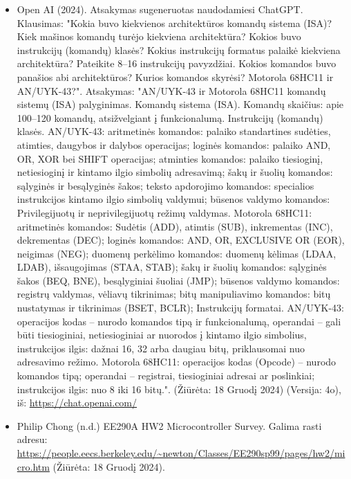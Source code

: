 \documentclass[a4paper,12pt]{article}
\begin{document}
\begin{itemize}
    \item Open AI (2024). Atsakymas sugeneruotas naudodamiesi ChatGPT. Klausimas: "Kokia buvo kiekvienos architektūros komandų sistema (ISA)? Kiek mašinos komandų turėjo kiekviena architektūra? Kokios buvo instrukcijų (komandų) klasės? Kokius instrukcijų formatus palaikė kiekviena architektūra? Pateikite 8–16 instrukcijų pavyzdžiai. Kokios komandos buvo panašios abi architektūros? Kurios komandos skyrėsi? Motorola 68HC11 ir AN/UYK-43?". Atsakymas: "AN/UYK-43 ir Motorola 68HC11 komandų sistemų (ISA) palyginimas. Komandų sistema (ISA). Komandų skaičius: apie 100–120 komandų, atsižvelgiant į funkcionalumą. Instrukcijų (komandų) klasės. AN/UYK-43: aritmetinės komandos: palaiko standartines sudėties, atimties, daugybos ir dalybos operacijas; loginės komandos: palaiko AND, OR, XOR bei SHIFT operacijas; atminties komandos: palaiko tiesioginį, netiesioginį ir kintamo ilgio simbolių adresavimą; šakų ir šuolių komandos: sąlyginės ir besąlyginės šakos; teksto apdorojimo komandos: specialios instrukcijos kintamo ilgio simbolių valdymui; būsenos valdymo komandos: Privilegijuotų ir neprivilegijuotų režimų valdymas. Motorola 68HC11: aritmetinės komandos: Sudėtis (ADD), atimtis (SUB), inkrementas (INC), dekrementas (DEC); loginės komandos: AND, OR, EXCLUSIVE OR (EOR), neigimas (NEG); duomenų perkėlimo komandos: duomenų kėlimas (LDAA, LDAB), išsaugojimas (STAA, STAB); šakų ir šuolių komandos: sąlyginės šakos (BEQ, BNE), besąlyginiai šuoliai (JMP); būsenos valdymo komandos: registrų valdymas, vėliavų tikrinimas; bitų manipuliavimo komandos: bitų nustatymas ir tikrinimas (BSET, BCLR); Instrukcijų formatai. AN/UYK-43: operacijos kodas – nurodo komandos tipą ir funkcionalumą, operandai – gali būti tiesioginiai, netiesioginiai ar nuorodos į kintamo ilgio simbolius, instrukcijos ilgis: dažnai 16, 32 arba daugiau bitų, priklausomai nuo adresavimo režimo. Motorola 68HC11: operacijos kodas (Opcode) – nurodo komandos tipą; operandai – registrai, tiesioginiai adresai ar poslinkiai; instrukcijos ilgis: nuo 8 iki 16 bitų.". (Žiūrėta: 18 Gruodį 2024) (Versija: 4o), iš: \url{https://chat.openai.com/}
    \item Philip Chong (n.d.) EE290A HW2 Microcontroller Survey. Galima rasti adresu: \url{https://people.eecs.berkeley.edu/~newton/Classes/EE290sp99/pages/hw2/micro.htm} (Žiūrėta: 18 Gruodį 2024).
    
\end{itemize}
\end{document}
